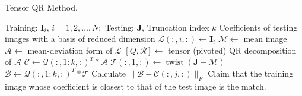 \documentclass[english]{article}
\newcommand{\<}{\langle}
\renewcommand{\>}{\rangle}
\theoremstyle{definition}
\begin{document}
\begin{algorithm}  
	\caption{Tensor QR Method.}
	\begin{algorithmic} 
		\Require  
		Training:  $\mathbf{I}_{i}$, $i=1,2, \ldots, N; $ Testing: $ \mathbf{J}$,  Truncation index $ k $
		\Ensure  
		Coefficients of testing images with a basis of reduced dimension  
		\State  $\mathcal{L}(:, i,:) \leftarrow \mathbf{I}_{i}$
		\EndFor
		\State $ \mathcal{M} \leftarrow $ mean image
		\State $ \mathcal{A} \leftarrow $ mean-deviation form of $ \mathcal{L}  $
		\State $ [Q, \mathcal{R}] \leftarrow $ tensor (pivoted) QR decomposition of $ \mathcal{A}  $
		\State $ \mathcal{C} \leftarrow \mathcal{Q}(:, 1: k,:)^{T} * \mathcal{A} $
		\State $ \mathcal{T}(:, 1,:) \leftarrow \operatorname{twist}(\mathbf{J}-\mathcal{M}) $
		\State $ \mathcal{B} \leftarrow \mathcal{Q}(:, 1: k,:)^{T} * \mathcal{T} $
		\State Calculate $ \|\mathcal{B}-\mathcal{C}(:, j,:)\|_{F} $
		\EndFor
		\State Claim that the training image whose coefficient is closest to that of the test image is the match. 
	\end{algorithmic}
\end{algorithm}
\end{document}
